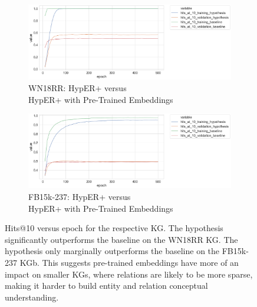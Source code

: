 \begin{figure}[H]
	\begin{subfigure}[b]{.5\linewidth}
   		\centering
    		\includegraphics[width=1.0\linewidth, height=0.6\linewidth]{WN18RR_hits_at_10_Results_ptwv}
		\captionsetup{justification=centering}
		\caption{WN18RR: HypER+ versus \\ HypER+ with Pre-Trained Embeddings}
	\end{subfigure}
	\begin{subfigure}[b]{.5\linewidth}
   		\centering
		\includegraphics[width=1.0\linewidth, height=0.6\linewidth]{FB15k-237_hits_at_10_Results_ptwv}
		\captionsetup{justification=centering}
		\caption{FB15k-237: HypER+ versus \\ HypER+ with Pre-Trained Embeddings}
	\end{subfigure}
	\caption{Hits@10 versus epoch for the respective KG. The hypothesis significantly outperforms the baseline on the WN18RR KG. The hypothesis only marginally outperforms the baseline on the FB15k-237 KGb. This suggests pre-trained embeddings have more of an impact on smaller KGs, where relations are likely to be more sparse, making it harder to build entity and relation conceptual understanding.}
\end{figure}



